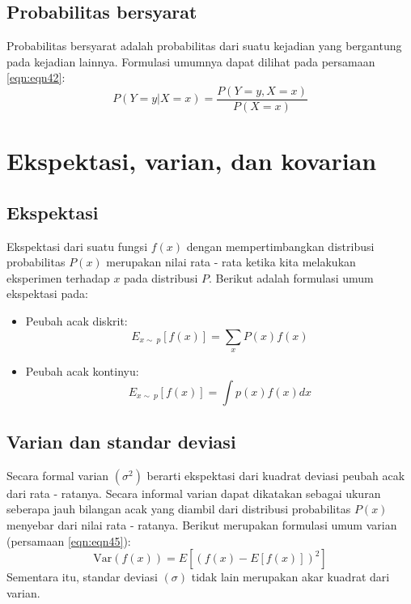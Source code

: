 \subsection{Probabilitas bersyarat}
Probabilitas bersyarat adalah probabilitas dari suatu kejadian yang bergantung pada kejadian lainnya. Formulasi umumnya dapat dilihat pada persamaan \ref{eqn:eqn42}:
\begin{equation}
    P(Y=y | X=x) = \frac{P(Y=y, X=x)}{P(X=x)}
    \label{eqn:eqn42}
\end{equation}

\section{Ekspektasi, varian, dan kovarian}
\subsection{Ekspektasi}
Ekspektasi dari suatu fungsi $f(x)$ dengan mempertimbangkan distribusi probabilitas $P(x)$ merupakan nilai rata - rata ketika kita melakukan eksperimen terhadap $x$ pada distribusi $P$. Berikut adalah formulasi umum ekspektasi pada:
\begin{itemize}
	\item Peubah acak diskrit: 
	\begin{equation}\label{eqn:eqn43}
		E_{x \sim\ p}\left[f(x)\right] = \sum_{x} P(x)f(x)
	\end{equation}
	\item Peubah acak kontinyu:
	\begin{equation}\label{eqn:eqn44}
		E_{x \sim\ p}\left[f(x)\right] = \int p(x) f(x) dx
	\end{equation}
\end{itemize}
\subsection{Varian dan standar deviasi}
Secara formal varian $(\sigma^2)$ berarti ekspektasi dari kuadrat deviasi peubah acak dari rata - ratanya. Secara informal varian dapat dikatakan sebagai ukuran seberapa jauh bilangan acak yang diambil dari distribusi probabilitas $P(x)$ menyebar dari nilai rata - ratanya. Berikut merupakan formulasi umum varian (persamaan \ref{eqn:eqn45}):
\begin{equation}
    \text{Var}(f(x)) = E\left[(f(x) - E[f(x)])^2\right]
    \label{eqn:eqn45}
\end{equation}
Sementara itu, standar deviasi $(\sigma)$ tidak lain merupakan akar kuadrat dari varian.
